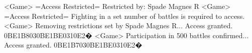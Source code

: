 <Game> =Access Restricted= Restricted by: Spade Magnes R 
<Game> =Access Restricted= Fighting in a set number of battles is required to access. 
<Game> Removing restrictions set by Spade Magnes R... Access granted. 
{0B}{E1}{B8}{03}{0B}{E1}{BE}{03}{10}{E2}�
<Game> Participation in 500 battles confirmed... Access granted. 
{0B}{E1}{B7}{03}{0B}{E1}{BE}{03}{10}{E2}�
